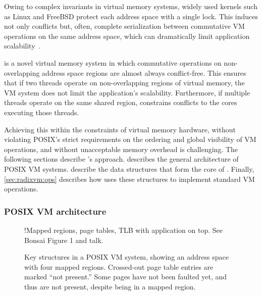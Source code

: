 Owing to complex invariants in virtual memory systems,
widely used kernels such as Linux and FreeBSD protect each address
space with a single lock.  This induces not only conflicts but, often,
complete serialization between commutative VM operations on the same
address space, which can dramatically limit application
scalability~\cite{boyd-wickizer:scaling,clements:bonsai}.

\vm is a novel virtual memory system in which commutative operations
on non-overlapping address space regions are almost always
conflict-free.  This ensures that if two threads operate on
non-overlapping
regions of virtual memory, the VM system does not limit the
application's scalability.  Furthermore, if multiple threads operate
on the same shared region, \vm constrains conflicts to the cores
executing those threads.

Achieving this within the constraints of virtual memory hardware,
without violating POSIX's strict requirements on the ordering and
global visibility of VM operations, and without unacceptable memory
overhead is challenging.  The following sections describe \vm's
approach.   describes the general architecture
of POSIX VM systems.   describe
the data structures that form the core of \vm.  Finally,
\cref{sec:radixvm:ops} describes how \vm uses these structures to
implement standard VM operations.



\subsubsection{POSIX VM architecture}
\label{sec:radixvm:arch}

\begin{figure}
  \centering
  \XXX!{Mapped regions, page tables, TLB with application on top.  See
    Bonsai Figure 1 and \vm talk.}
  \caption[Key structures in a POSIX VM system.]{Key structures in a
    POSIX VM system, showing an address space with four mapped
    regions.  Crossed-out page table entries are marked ``not
    present.''  Some pages have not been faulted yet, and thus are not
    present, despite being in a mapped region.}
  \label{fig:vm-structures}
\end{figure}


